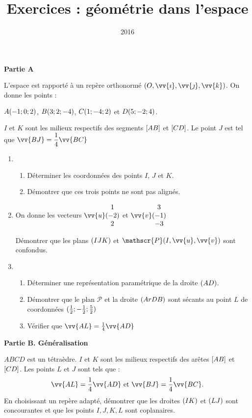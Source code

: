 \documentclass[12pt,a4paper,french]{article}
\title{Exercices : géométrie dans l'espace}
\author{\bsc{Ts 3}}
\date{2016}
\makeatletter
\renewcommand{\maketitle}%
{\framebox{%
    \begin{minipage}{1.0\linewidth}%
      \begin{center}%
        \Large \@title ~-- \@author \\%
        \@date%
      \end{center}%
    \end{minipage}}%
  \normalsize%
}
\theoremstyle{break}
\theoremstyle{plain}
\theoremstyle{nonumberplain}
\theoremstyle{nonumberbreak}
\makeatother
\begin{document}
\maketitle

\begin{question}

  \textbf{Partie A}

  L'espace est rapporté à un repère orthonormé $\brk*{O, \vv{\imath},
  \vv{\jmath}, \vv{k}}$. On donne les points :

  $A \brk*{-1;0;2}$, $B \brk*{3;2;-4}$, $C \brk*{1;-4;2}$ et $D
  \brk*{5;-2;4}$.

  $I$ et $K$ sont les milieux respectifs des segments $\brk[s]*{AB}$ et
  $\brk[s]*{CD}$. Le point $J$ est tel que $\vv{BJ} = \dfrac14\vv{BC}$

  \begin{enumerate}
    \item
      \begin{enumerate}
        \item Déterminer les coordonnées des points $I$, $J$ et $K$.
        \item Démontrer que ces trois points ne sont pas alignés.
      \end{enumerate}
    \item On donne les vecteurs $\vv{u} \brk*{\begin{matrix} 1 \\ -2
      \\2 \end{matrix}}$ et $\vv{v} \brk*{\begin{matrix} 3 \\ -1 \\ -3
      \end{matrix}}$

      Démontrer que les plans $\brk*{IJK}$ et $\mathscr{P}\brk*{I,
      \vv{u}, \vv{v}}$ sont confondus.
    \item
      \begin{enumerate}
        \item Déterminer une représentation paramétrique de la droite
          $\brk*{AD}$.
        \item Démontrer que le plan $\mathscr{P}$ et la droite
          $\brk*{ArDB}$ sont sécants au point $L$ de coordonnées
          $\brk*{\frac12 ; -\frac12 ; \frac52}$
        \item Vérifier que $\vv{AL} = \frac14 \vv{AD}$
      \end{enumerate}
  \end{enumerate}

  \textbf{Partie B. Généralisation}

  $ABCD$ est un tétraèdre. $I$ et $K$ sont les milieux respectifs des
  arêtes $\brk[s]*{AB}$ et $\brk[s]*{CD}$. Les points $L$ et $J$ sont
  tels que : \[ \vv{AL} = \frac14 \vv{AD} \text{ et } \vv{BJ} = \frac14
  \vv{BC} .\] En choisissant un repère adapté, démontrer que les droites
  $\brk{IK}$ et $\brk{LJ}$ sont concourantes et que les points $I,J,K,L$
  sont coplanaires.

\end{question}
\end{document}
